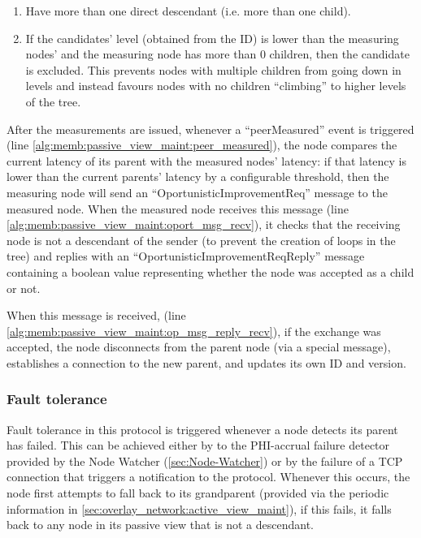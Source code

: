 \begin{enumerate}
    \item Have more than one direct descendant (i.e. more than one child). 
    
    \item If the candidates' level (obtained from the ID) is lower than the measuring nodes' and the measuring node has more than 0 children, then the candidate is excluded. This prevents nodes with multiple children from going down in levels and instead favours nodes with no children ``climbing'' to higher levels of the tree.
\end{enumerate}

After the measurements are issued, whenever a ``peerMeasured'' event is triggered (line \ref{alg:memb:passive_view_maint:peer_measured}), the node compares the current latency of its parent with the measured nodes' latency: if that latency is lower than the current parents' latency by a configurable threshold, then the measuring node will send an ``OportunisticImprovementReq'' message to the measured node. When the measured node receives this message (line \ref{alg:memb:passive_view_maint:oport_msg_recv}), it checks that the receiving node is not a descendant of the sender (to prevent the creation of loops in the tree) and replies with an ``OportunisticImprovementReqReply'' message containing a boolean value representing whether the node was accepted as a child or not.

When this message is received, (line \ref{alg:memb:passive_view_maint:op_msg_reply_recv}), if the exchange was accepted, the node disconnects from the parent node (via a special message), establishes a connection to the new parent, and updates its own ID and version.

\subsubsection{Fault tolerance}

Fault tolerance in this protocol is triggered whenever a node detects its parent has failed. This can be achieved either by to the PHI-accrual failure detector provided by the Node Watcher (\ref{sec:Node-Watcher}) or by the failure of a TCP connection that triggers a notification to the protocol. Whenever this occurs, the node first attempts to fall back to its grandparent (provided via the periodic information in \ref{sec:overlay_network:active_view_maint}), if this fails, it falls back to any node in its passive view that is not a descendant.

